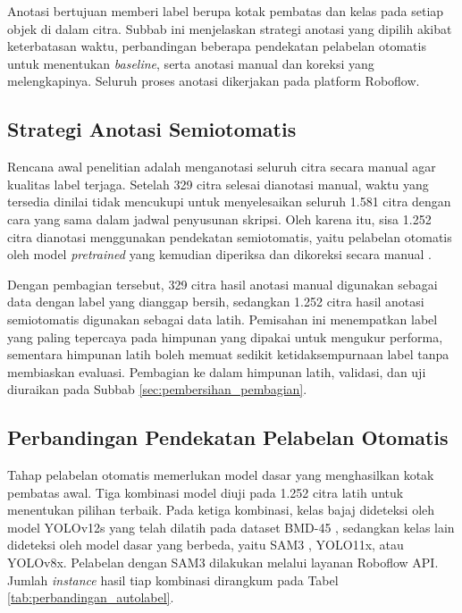 Anotasi bertujuan memberi label berupa kotak pembatas dan kelas pada setiap objek di 
dalam citra. Subbab ini menjelaskan strategi anotasi yang dipilih akibat keterbatasan 
waktu, perbandingan beberapa pendekatan pelabelan otomatis untuk menentukan 
\textit{baseline}, serta anotasi manual dan koreksi yang melengkapinya. Seluruh proses 
anotasi dikerjakan pada platform Roboflow.

\subsection{Strategi Anotasi Semiotomatis}

Rencana awal penelitian adalah menganotasi seluruh citra secara manual agar kualitas 
label terjaga. Setelah 329 citra selesai dianotasi manual, waktu yang tersedia dinilai 
tidak mencukupi untuk menyelesaikan seluruh 1.581 citra dengan cara yang sama dalam 
jadwal penyusunan skripsi. Oleh karena itu, sisa 1.252 citra dianotasi menggunakan 
pendekatan semiotomatis, yaitu pelabelan otomatis oleh model \textit{pretrained} yang 
kemudian diperiksa dan dikoreksi secara manual \cite{tenckhoff2025feedback}.

Dengan pembagian tersebut, 329 citra hasil anotasi manual digunakan sebagai data dengan 
label yang dianggap bersih, sedangkan 1.252 citra hasil anotasi semiotomatis digunakan 
sebagai data latih. Pemisahan ini menempatkan label yang paling tepercaya pada himpunan yang 
dipakai untuk mengukur performa, sementara himpunan latih boleh memuat sedikit 
ketidaksempurnaan label tanpa membiaskan evaluasi. Pembagian ke dalam himpunan latih, 
validasi, dan uji diuraikan pada Subbab \ref{sec:pembersihan_pembagian}.

\subsection{Perbandingan Pendekatan Pelabelan Otomatis}

Tahap pelabelan otomatis memerlukan model dasar yang menghasilkan kotak pembatas awal. 
Tiga kombinasi model diuji pada 1.252 citra latih untuk menentukan pilihan terbaik. 
Pada ketiga kombinasi, kelas bajaj dideteksi oleh model YOLOv12s yang telah dilatih pada 
dataset BMD-45 \cite{sharma2025bmd}, sedangkan kelas lain dideteksi oleh model dasar yang 
berbeda, yaitu SAM3 \cite{carion2025sam3}, YOLO11x, atau YOLOv8x. Pelabelan dengan SAM3 
dilakukan melalui layanan Roboflow API. Jumlah \textit{instance} hasil tiap kombinasi 
dirangkum pada Tabel \ref{tab:perbandingan_autolabel}.

